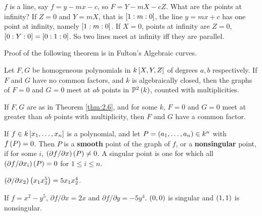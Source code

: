 \begin{example*}
$ f $ is a line, say $ f = y - mx - c $, so $ F = Y - mX - cZ $. What are the points at infinity? If $ Z = 0 $ and $ Y = mX $, that is $ \sb{1 : m : 0} $, the line $ y = mx + c $ has one point at infinity, namely $ \sb{1 : m : 0} $. If $ X = 0 $, points at infinity are $ Z = 0 $, $ \sb{0 : Y : 0} = \sb{0 : 1 : 0} $. So two lines meet at infinity iff they are parallel.
\end{example*}


Proof of the following theorem is in Fulton's Algebraic curves.

\begin{theorem}
\label{thm:2.6}
Let $ F, G $ be homogeneous polynomials in $ k\sb{X, Y, Z} $ of degrees $ a, b $ respectively. If $ F $ and $ G $ have no common factors, and $ k $ is algebraically closed, then the graphs of $ F = 0 $ and $ G = 0 $ meet at $ ab $ points in $ \P^2\rb{k} $, counted with multiplicities.
\end{theorem}

\begin{corollary}
If $ F, G $ are as in Theorem \ref{thm:2.6}, and for some $ k $, $ F = 0 $ and $ G = 0 $ meet at greater than $ ab $ points with multiplicity, then $ F $ and $ G $ have a common factor.
\end{corollary}

\pagebreak

\begin{definition}
If $ f \in k\sb{x_1, \dots, x_n} $ is a polynomial, and let $ P = \rb{a_1, \dots, a_n} \in k^n $ with $ f\rb{P} = 0 $. Then $ P $ is a \textbf{smooth} point of the graph of $ f $, or a \textbf{nonsingular} point, if for some $ i $, $ \rb{\partial f / \partial x}\rb{P} \ne 0 $. A singular point is one for which all $ \rb{\partial f / \partial x_i}\rb{P} = 0 $ for $ 1 \le i \le n $.
\end{definition}

\begin{example*}
$ \rb{\partial / \partial x_2}\rb{x_1x_2^5} = 5x_1x_2^4 $.
\end{example*}

\begin{example*}
If $ f = x^2 - y^5 $, $ \partial f / \partial x = 2x $ and $ \partial f / \partial y = -5y^4 $. $ \rb{0, 0} $ is singular and $ \rb{1, 1} $ is nonsingular.
\end{example*}

